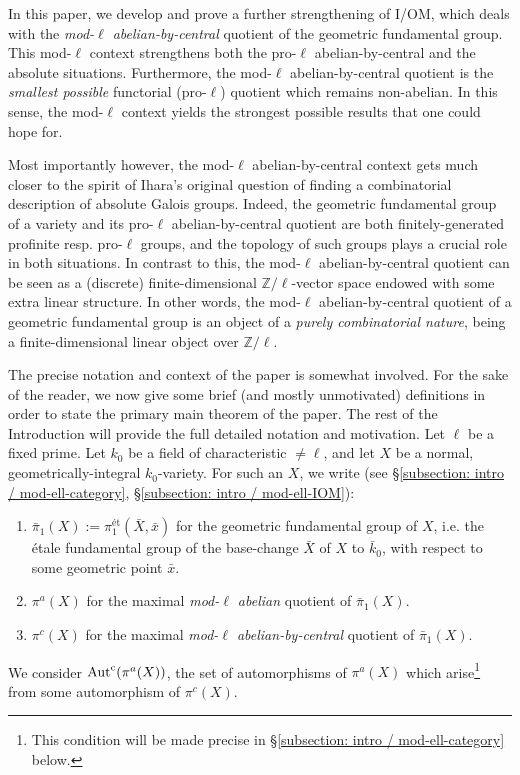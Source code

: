 \documentclass[11pt]{amsart}
\theoremstyle{definition}
\theoremstyle{remark}
\numberwithin{equation}{section}
\DeclareMathOperator{\Aut}{Aut}
\newcommand{\Z}{\mathbb{Z}}
\newcommand{\Autc}{\Aut^{\rm c}}
\begin{document}
In this paper, we develop and prove a further strengthening of I/OM, which deals with the \emph{mod-$\ell$ abelian-by-central} quotient of the geometric fundamental group.
This mod-$\ell$ context strengthens both the pro-$\ell$ abelian-by-central and the absolute situations.
Furthermore, the mod-$\ell$ abelian-by-central quotient is the \emph{smallest possible} functorial (pro-$\ell$) quotient which remains non-abelian.
In this sense, the mod-$\ell$ context yields the strongest possible results that one could hope for.

Most importantly however, the mod-$\ell$ abelian-by-central context gets much closer to the spirit of {\sc Ihara's} original question of finding a combinatorial description of absolute Galois groups.
Indeed, the geometric fundamental group of a variety and its pro-$\ell$ abelian-by-central quotient are both finitely-generated profinite resp. pro-$\ell$ groups, and the topology of such groups plays a crucial role in both situations.
In contrast to this, the mod-$\ell$ abelian-by-central quotient can be seen as a (discrete) finite-dimensional $\Z/\ell$-vector space endowed with some extra linear structure.
In other words, the mod-$\ell$ abelian-by-central quotient of a geometric fundamental group is an object of a \emph{purely combinatorial nature}, being a finite-dimensional linear object over $\Z/\ell$.

The precise notation and context of the paper is somewhat involved.
For the sake of the reader, we now give some brief (and mostly unmotivated) definitions in order to state the primary main theorem of the paper.
The rest of the Introduction will provide the full detailed notation and motivation.
Let $\ell$ be a fixed prime.
Let $k_0$ be a field of characteristic $\neq \ell$, and let $X$ be a normal, geometrically-integral $k_0$-variety.
For such an $X$, we write (see \S\ref{subsection: intro / mod-ell-category}, \S\ref{subsection: intro / mod-ell-IOM}):
\begin{enumerate}
  \item $\bar\pi_1(X) := \pi_1^\text{\'et}(\bar X,\bar x)$ for the geometric fundamental group of $X$, i.e. the \'etale fundamental group of the base-change $\bar X$ of $X$ to $\bar k_0$, with respect to some geometric point $\bar x$.
  \item $\pi^a(X)$ for the maximal \emph{mod-$\ell$ abelian} quotient of $\bar\pi_1(X)$.
  \item $\pi^c(X)$ for the maximal \emph{mod-$\ell$ abelian-by-central} quotient of $\bar\pi_1(X)$.
\end{enumerate}
We consider $\Autc(\pi^a(X))$, the set of automorphisms of $\pi^a(X)$ which arise\footnote{This condition will be made precise in \S\ref{subsection: intro / mod-ell-category} below.} from some automorphism of $\pi^c(X)$.
\end{document}
